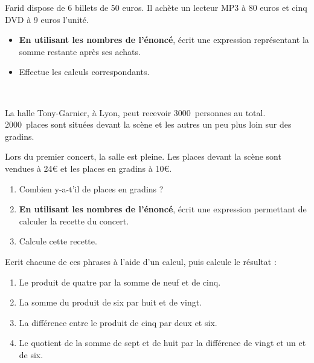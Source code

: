 \documentclass[a4paper,11pt]{article}
\begin{document}
\begin{question}[(3 points)]
	Farid dispose de 6 billets de 50 euros. Il achète un lecteur MP3 à 80 euros et cinq DVD à 9 euros l'unité.
	\begin{itemize}
		\item \textbf{En utilisant les nombres de l'énoncé}, écrit une expression représentant la somme restante après ses achats. \vspace{2em}
		\item Effectue les calculs correspondants. \vspace{8em}
	\end{itemize}
\end{question}

\begin{question}[(4 points)]\

	La halle Tony-Garnier, à Lyon, peut recevoir 3000 personnes au total. 2000 places sont situées devant la scène et les autres un peu plus loin sur des gradins.

	Lors du premier concert, la salle est pleine. Les places devant la scène sont vendues à 24€ et les places en gradins à 10€.
	\begin{enumerate}
		\item Combien y-a-t'il de places en gradins ?
		\item \textbf{En utilisant les nombres de l'énoncé}, écrit une expression permettant de calculer la recette du concert. \vspace{2em}
		\item Calcule cette recette. \vspace{12em}
	\end{enumerate}
\end{question}

\begin{question}[(2 points)]
	Ecrit chacune de ces phrases à l’aide d’un calcul, puis calcule le résultat :
	\begin{enumerate}
		\item Le produit de quatre par la somme de neuf et de cinq. \vspace{3em}
		\item La somme du produit de six par huit et de vingt. \vspace{3em}
		\item La différence entre le produit de cinq par deux et six. \vspace{3em}
		\item Le quotient de la somme de sept et de huit par la différence de vingt et un et de six.
	\end{enumerate}
\end{question}
\end{document}

